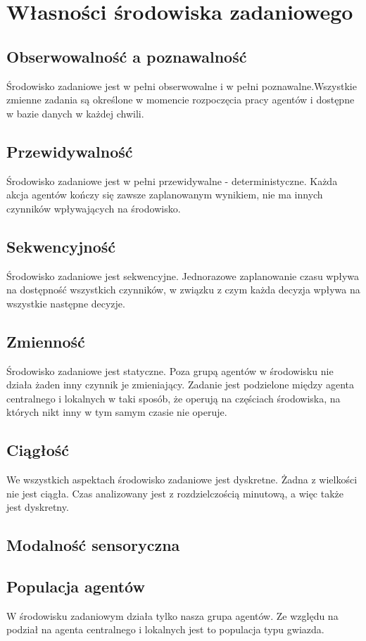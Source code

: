 \section{Własności środowiska zadaniowego}
\subsection{Obserwowalność a poznawalność}
Środowisko zadaniowe jest w pełni obserwowalne i w pełni poznawalne.Wszystkie zmienne zadania są określone w momencie
 rozpoczęcia pracy agentów i dostępne w bazie danych w każdej chwili.
 
\subsection{Przewidywalność}
Środowisko zadaniowe jest w pełni przewidywalne - deterministyczne. Każda akcja agentów kończy się zawsze zaplanowanym
 wynikiem, nie ma innych czynników wpływających na środowisko.

\subsection{Sekwencyjność}
Środowisko zadaniowe jest sekwencyjne. Jednorazowe zaplanowanie czasu wpływa na dostępność wszystkich czynników,
w związku z czym każda decyzja wpływa na wszystkie następne decyzje.

\subsection{Zmienność}
Środowisko zadaniowe jest statyczne. Poza grupą agentów w środowisku nie działa żaden inny czynnik je zmieniający.
Zadanie jest podzielone między agenta centralnego i lokalnych w taki sposób, że operują na częściach środowiska, na których
nikt inny w tym samym czasie nie operuje.

\subsection{Ciągłość}
We wszystkich aspektach środowisko zadaniowe jest dyskretne. Żadna z wielkości nie jest ciągła. Czas analizowany jest
z rozdzielczością minutową, a więc także jest dyskretny.

\subsection{Modalność sensoryczna}


\subsection{Populacja agentów}
W środowisku zadaniowym działa tylko nasza grupa agentów. Ze względu na podział na agenta centralnego i lokalnych
jest to populacja typu gwiazda.

